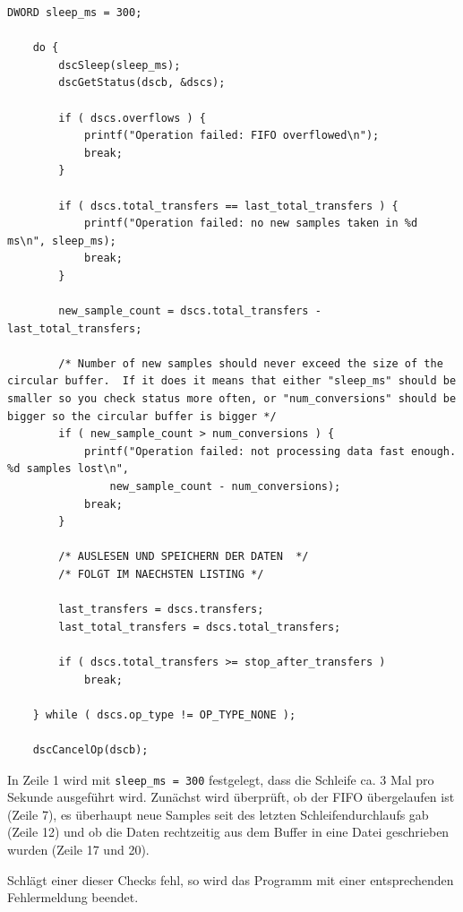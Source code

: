 \documentclass[12pt,a4paper]{scrartcl}
\begin{document}
\begin{lstlisting}[frame=trBL]
	DWORD sleep_ms = 300;
	
	do {
        dscSleep(sleep_ms);
        dscGetStatus(dscb, &dscs);

        if ( dscs.overflows ) {
            printf("Operation failed: FIFO overflowed\n");
            break;
        }

        if ( dscs.total_transfers == last_total_transfers ) {
            printf("Operation failed: no new samples taken in %d ms\n", sleep_ms);
            break;
        }

        new_sample_count = dscs.total_transfers - last_total_transfers;

        /* Number of new samples should never exceed the size of the circular buffer.  If it does it means that either "sleep_ms" should be smaller so you check status more often, or "num_conversions" should be bigger so the circular buffer is bigger */
        if ( new_sample_count > num_conversions ) {
            printf("Operation failed: not processing data fast enough.  %d samples lost\n",
                new_sample_count - num_conversions);
            break;
        }

		/* AUSLESEN UND SPEICHERN DER DATEN  */
		/* FOLGT IM NAECHSTEN LISTING */
       
        last_transfers = dscs.transfers;
        last_total_transfers = dscs.total_transfers;

        if ( dscs.total_transfers >= stop_after_transfers )
            break;

    } while ( dscs.op_type != OP_TYPE_NONE );

    dscCancelOp(dscb);
\end{lstlisting}	

In Zeile 1 wird mit \texttt{sleep\_ms = 300} festgelegt, dass die Schleife ca. 3 Mal pro Sekunde ausgeführt wird. Zunächst wird überprüft, ob der FIFO übergelaufen ist (Zeile 7), es überhaupt neue Samples seit des letzten Schleifendurchlaufs gab (Zeile 12) und ob die Daten rechtzeitig aus dem Buffer in eine Datei geschrieben wurden (Zeile 17 und 20). 

Schlägt einer dieser Checks fehl, so wird das Programm mit einer entsprechenden Fehlermeldung beendet.\\
\end{document}
